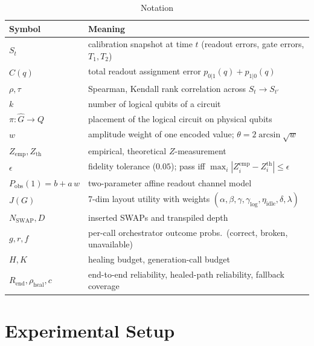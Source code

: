 \documentclass[journal,10pt,twocolumn]{IEEEtran}
\begin{document}
\begin{table}[t]
\caption{Notation}
\label{tab:notation}
\centering
\small
\renewcommand{\arraystretch}{1.15}
\begin{tabular}{@{}lp{5.8cm}@{}}
\toprule
Symbol & Meaning\\
\midrule
$S_t$ & calibration snapshot at time $t$ (readout errors, gate errors, $T_1,T_2$)\\
$C(q)$ & total readout assignment error $p_{0|1}(q)+p_{1|0}(q)$\\
$\rho,\tau$ & Spearman, Kendall rank correlation across $S_t\to S_{t'}$\\
$k$ & number of logical qubits of a circuit\\
$\pi:\hat{G}\to Q$ & placement of the logical circuit on physical qubits\\
$w$ & amplitude weight of one encoded value; $\theta=2\arcsin\sqrt{w}$\\
$Z_{\mathrm{emp}},Z_{\mathrm{th}}$ & empirical, theoretical $Z$-measurement\\
$\epsilon$ & fidelity tolerance ($0.05$); pass iff $\max_i|Z_i^{\mathrm{emp}}-Z_i^{\mathrm{th}}|\le\epsilon$\\
$P_{\mathrm{obs}}(1)=b+a\,w$ & two-parameter affine readout channel model\\
$J(G)$ & 7-dim layout utility with weights $(\alpha,\beta,\gamma,\gamma_{\log},\eta_{\mathrm{idle}},\delta,\lambda)$\\
$N_{\mathrm{SWAP}},D$ & inserted SWAPs and transpiled depth\\
$g,r,f$ & per-call orchestrator outcome probs.\ (correct, broken, unavailable)\\
$H,K$ & healing budget, generation-call budget\\
$R_{\mathrm{end}},\rho_{\mathrm{heal}},c$ & end-to-end reliability, healed-path reliability, fallback coverage\\
\bottomrule
\end{tabular}
\end{table}

\section{Experimental Setup}
\label{sec:setup}
\end{document}
